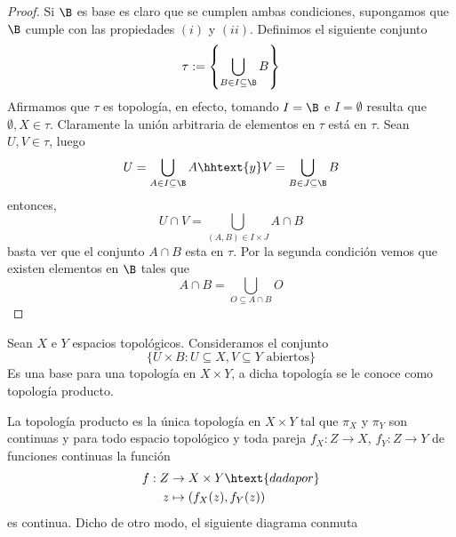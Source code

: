 \documentclass[11pt]{article}
\begin{document}
\begin{proof}
    Si $\B$ es base es claro que se cumplen ambas condiciones, supongamos que $\B$ cumple con las
    propiedades $(i)$ y $(ii)$. Definimos el siguiente conjunto
    \begin{equation*}
        \tau:=\left\{\bigcup_{B\in I\subseteq\B}B\right\}
    \end{equation*}
    Afirmamos que $\tau$ es topología, en efecto, tomando $I=\B$ e $I=\emptyset$ resulta que
    $\emptyset,X\in\tau$. Claramente la unión arbitraria de elementos en $\tau$ está en $\tau$.
    Sean $U,V\in\tau$, luego
    \begin{equation*}
        U=\bigcup_{A\in I\subseteq\B}A \hhtext{y} V=\bigcup_{B\in J\subseteq\B}B
    \end{equation*}
    entonces,
    \begin{equation*}
        U\cap V=\bigcup_{(A,B)\in I\times J}A\cap B
    \end{equation*}
    basta ver que el conjunto $A\cap B$ esta en $\tau$. Por la segunda condición vemos que existen
    elementos en $\B$ tales que
    \begin{equation*}
        A\cap B=\bigcup_{O\subseteq A\cap B}O
    \end{equation*}
\end{proof}

\begin{dfn}
    Sean $X$ e $Y$ espacios topológicos. Consideramos el conjunto
    \begin{equation*}
        \{U\times B:U\subseteq X,V\subseteq Y \text{ abiertos}\}
    \end{equation*}
    Es una base para una topología en $X\times Y$, a dicha topología se le conoce como topología
    producto.
\end{dfn}

\begin{lema}
    La topología producto es la única topología en $X\times Y$ tal que $\pi_{X}$ y $\pi_{Y}$ son 
    continuas y para todo espacio topológico y toda pareja $f_{X}:Z\to X$, $f_{Y}:Z\to Y$ de 
    funciones continuas la función
    \begin{align*}
        f:Z &\to X\times Y \htext{dada por} \\
        z &\mapsto (f_{X}(z),f_{Y}(z))
    \end{align*}
    es continua. Dicho de otro modo, el siguiente diagrama conmuta
    
    \centerline{
    }
\end{lema}
\end{document}
